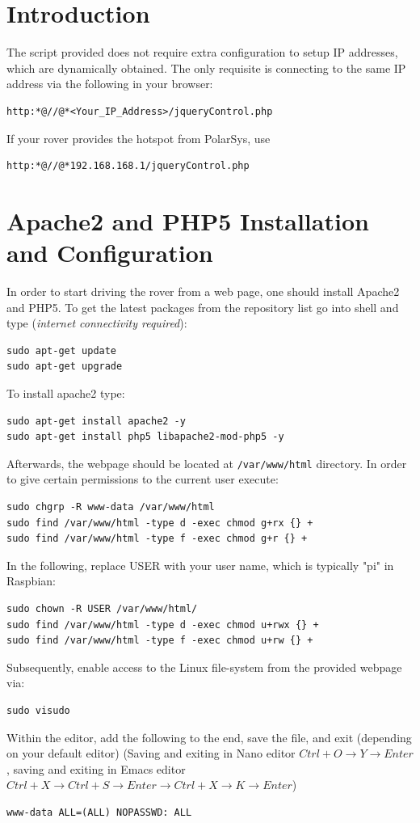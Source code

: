 	\section{Introduction}
The script provided does not require extra configuration to setup IP addresses, which are dynamically obtained. The only requisite is connecting to the same IP address via the following in your browser:
\begin{lstlisting}[label={lst:1}]
http:*@//@*<Your_IP_Address>/jqueryControl.php
\end{lstlisting}
If your rover provides the hotspot from PolarSys, use
\begin{lstlisting}[label={lst:partWrkflw}]
http:*@//@*192.168.168.1/jqueryControl.php
\end{lstlisting}

	\section{Apache2 and PHP5 Installation and Configuration}
	In order to start driving the rover from a web page, one should install Apache2 and PHP5. To get the latest packages from the repository list go into shell and type (\textit{internet connectivity required}):
\begin{lstlisting}
sudo apt-get update
sudo apt-get upgrade
\end{lstlisting}
To install apache2 type:
\begin{lstlisting}
sudo apt-get install apache2 -y
sudo apt-get install php5 libapache2-mod-php5 -y
\end{lstlisting}
Afterwards, the webpage should be located at \texttt{/var/www/html} directory. In order to give certain permissions to the current user execute: 
\begin{lstlisting}
sudo chgrp -R www-data /var/www/html
sudo find /var/www/html -type d -exec chmod g+rx {} +
sudo find /var/www/html -type f -exec chmod g+r {} +
\end{lstlisting}
In the following, replace USER with your user name, which is typically "pi" in Raspbian:

\begin{lstlisting}
sudo chown -R USER /var/www/html/
sudo find /var/www/html -type d -exec chmod u+rwx {} +
sudo find /var/www/html -type f -exec chmod u+rw {} +
\end{lstlisting}
Subsequently, enable access to the Linux file-system from the provided webpage via:
\begin{lstlisting}
sudo visudo
\end{lstlisting}
Within the editor, add the following to the end, save the file, and exit (depending on your default editor)
(Saving and exiting in Nano editor $Ctrl+O \rightarrow Y \rightarrow Enter$, saving and exiting in Emacs editor $Ctrl + X \rightarrow Ctrl + S \rightarrow Enter \rightarrow Ctrl + X \rightarrow K \rightarrow Enter$) 
\begin{lstlisting}
www-data ALL=(ALL) NOPASSWD: ALL
\end{lstlisting}
